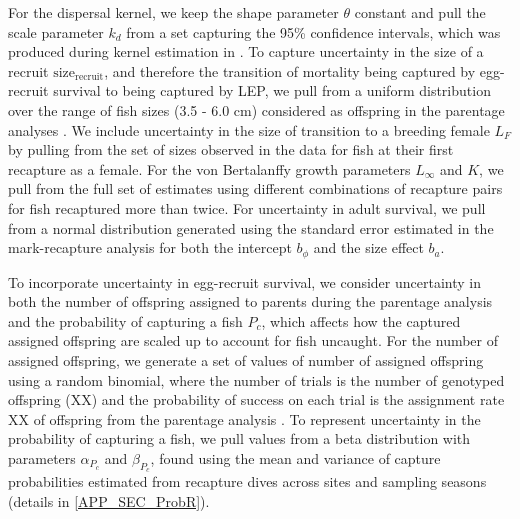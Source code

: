 \documentclass[12pt, oneside]{article}   	%
\begin{document}
For the dispersal kernel, we keep the shape parameter $\theta$ constant and pull the scale parameter $k_d$ from a set capturing the 95\% confidence intervals, which was produced during kernel estimation in \citep{catalanoInPrepconnectivity}. To capture uncertainty in the size of a recruit $\text{size}_\text{recruit}$, and therefore the transition of mortality being captured by egg-recruit survival to being captured by LEP, we pull from a uniform distribution over the range of fish sizes (3.5 - 6.0 cm) considered as offspring in the parentage analyses \citep{catalanoInPrepconnectivity}. We include uncertainty in the size of transition to a breeding female $L_F$ by pulling from the set of sizes observed in the data for fish at their first recapture as a female. For the von Bertalanffy growth parameters $L_\infty$ and $K$, we pull from the full set of estimates using different combinations of recapture pairs for fish recaptured more than twice. For uncertainty in adult survival, we pull from a normal distribution generated using the standard error estimated in the mark-recapture analysis for both the intercept $b_\phi$ and the size effect $b_a$.

To incorporate uncertainty in egg-recruit survival, we consider uncertainty in both the number of offspring assigned to parents during the parentage analysis and the probability of capturing a fish $P_c$, which affects how the captured assigned offspring are scaled up to account for fish uncaught. For the number of assigned offspring, we generate a set of values of number of assigned offspring using a random binomial, where the number of trials is the number of genotyped offspring (XX) and the probability of success on each trial is the assignment rate XX of offspring from the parentage analysis \citep{catalanoInPrepconnectivity}. To represent uncertainty in the probability of capturing a fish, we pull values from a beta distribution with parameters $\alpha_{P_c}$ and $\beta_{P_c}$, found using the mean and variance of capture probabilities estimated from recapture dives across sites and sampling seasons (details in \ref{APP_SEC_ProbR}). 





\end{document}
